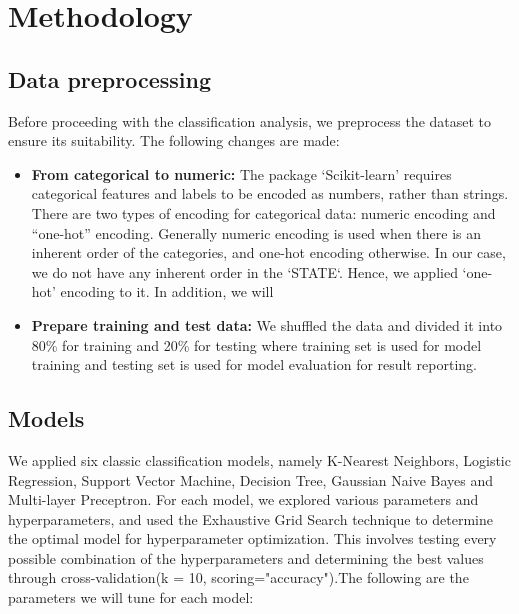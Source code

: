 \documentclass{article}
\begin{document}
\section{Methodology}

\subsection{Data preprocessing}

Before proceeding with the classification analysis, we preprocess the dataset to ensure its suitability. The following changes are made:

\begin{itemize}

\item {\bf From categorical to numeric:} The package ‘Scikit-learn’ requires categorical features and labels to be encoded as numbers, rather than strings. There are two types of encoding for categorical data: numeric encoding and “one-hot” encoding. Generally numeric encoding is used when there is an inherent order of the categories, and one-hot encoding otherwise. In our case, we do not have any inherent order in the `STATE`. Hence, we applied ‘one-hot’ encoding to it. In addition, we will 

\item {\bf Prepare training and test data:} We shuffled the data and divided it into 80\% for training and 20\% for testing where training set is used for model training and testing set is used for model evaluation for result reporting.

\end{itemize}

\subsection{Models}

We applied six classic classification models, namely K-Nearest Neighbors, Logistic Regression, Support Vector Machine, Decision Tree, Gaussian Naive Bayes and Multi-layer Preceptron. For each model, we explored various parameters and hyperparameters, and used the Exhaustive Grid Search technique to determine the optimal model for hyperparameter optimization. This involves testing every possible combination of the hyperparameters and determining the best values through cross-validation(k = 10, scoring="accuracy").The following are the parameters we will tune for each model:
\end{document}
